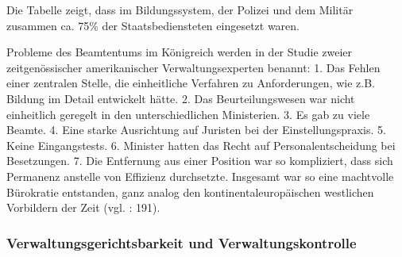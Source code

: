 Die Tabelle zeigt, dass im Bildungssystem, der Polizei und dem Militär zusammen ca. 75\% der Staatsbediensteten eingesetzt waren.\par
Probleme des Beamtentums im Königreich werden in der Studie zweier zeitgenössischer amerikanischer Verwaltungsexperten benannt: 1. Das Fehlen einer zentralen Stelle, die einheitliche Verfahren zu Anforderungen, wie z.B. Bildung im Detail entwickelt hätte. 2. Das Beurteilungswesen war nicht einheitlich geregelt in den unterschiedlichen Ministerien. 3. Es gab zu viele Beamte. 4. Eine starke Ausrichtung auf Juristen bei der Einstellungspraxis. 5. Keine Eingangstests. 6. Minister hatten das Recht auf Personalentscheidung bei Besetzungen. 7. Die Entfernung aus einer Position war so kompliziert, dass sich Permanenz anstelle von Effizienz durchsetzte. Insgesamt war so eine machtvolle Bürokratie entstanden, ganz analog den kontinentaleuropäischen westlichen Vorbildern der Zeit (vgl. \cite{beardradin}: 191).

\subsubsection{Verwaltungsgerichtsbarkeit und Verwaltungskontrolle}

